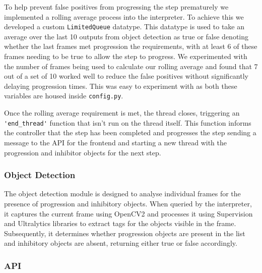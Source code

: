 \documentclass{article}
\begin{document}
    To help prevent false positives from progressing the step prematurely we implemented a rolling average process into the interpreter. To achieve this we developed a custom \verb|LimitedQueue| datatype. This datatype is used to take an average over the last 10 outputs from object detection as true or false denoting whether the last frames met progression the requirements, with at least 6 of these frames needing to be true to allow the step to progress. We experimented with the number of frames being used to calculate our rolling average and found that 7 out of a set of 10 worked well to reduce the false positives without significantly delaying progression times. This was easy to experiment with as both these variables are housed inside \verb|config.py|.
    
    Once the rolling average requirement is met, the thread closes, triggering an \verb|'end_thread'| function that isn’t run on the thread itself. This function informs the controller that the step has been completed and progresses the step sending a message to the API for the frontend and starting a new thread with the progression and inhibitor objects for the next step.

    \subsubsection{Object Detection}
    The object detection module is designed to analyse individual frames for the presence of progression and inhibitory objects. When queried by the interpreter, it captures the current frame using OpenCV2 and processes it using Supervision and  Ultralytics libraries to extract tags for the objects visible in the frame. Subsequently, it determines whether progression objects are present in the list and inhibitory objects are absent, returning either true or false accordingly.
    \subsubsection{API}
\end{document}
